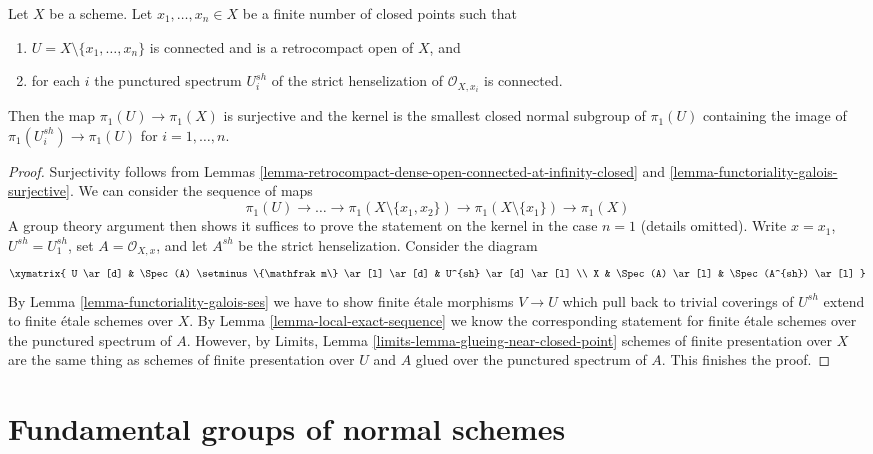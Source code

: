\begin{lemma}
\label{lemma-exact-sequence-finite-nr-closed-pts}
Let $X$ be a scheme. Let $x_1, \ldots, x_n \in X$ be a finite
number of closed points such that
\begin{enumerate}
\item $U = X \setminus \{x_1, \ldots, x_n\}$ is connected and is
a retrocompact open of $X$, and
\item for each $i$ the punctured spectrum $U_i^{sh}$ of the
strict henselization of $\mathcal{O}_{X, x_i}$ is connected.
\end{enumerate}
Then the map $\pi_1(U) \to \pi_1(X)$ is surjective and the kernel
is the smallest closed normal subgroup of $\pi_1(U)$ containing
the image of $\pi_1(U_i^{sh}) \to \pi_1(U)$ for $i = 1, \ldots, n$.
\end{lemma}

\begin{proof}
Surjectivity follows from
Lemmas \ref{lemma-retrocompact-dense-open-connected-at-infinity-closed} and
\ref{lemma-functoriality-galois-surjective}.
We can consider the sequence of maps
$$
\pi_1(U)  \to \ldots \to
\pi_1(X \setminus \{x_1, x_2\}) \to \pi_1(X \setminus \{x_1\}) \to \pi_1(X)
$$
A group theory argument then shows it suffices to prove the statement on the
kernel in the case $n = 1$ (details omitted). Write
$x = x_1$, $U^{sh} = U_1^{sh}$,
set $A = \mathcal{O}_{X, x}$, and let $A^{sh}$ be the strict henselization.
Consider the diagram
$$
\xymatrix{
U \ar[d] &
\Spec(A) \setminus \{\mathfrak m\} \ar[l] \ar[d] &
U^{sh} \ar[d] \ar[l] \\
X & \Spec(A) \ar[l] & \Spec(A^{sh}) \ar[l]
}
$$
By Lemma \ref{lemma-functoriality-galois-ses}
we have to show finite \'etale morphisms
$V \to U$ which pull back to trivial coverings of $U^{sh}$
extend to finite \'etale schemes over $X$.
By Lemma \ref{lemma-local-exact-sequence}
we know the corresponding statement
for finite \'etale schemes over the punctured spectrum of $A$.
However, by Limits, Lemma \ref{limits-lemma-glueing-near-closed-point}
schemes of finite presentation over $X$ are the same thing as
schemes of finite presentation over $U$ and $A$ glued over
the punctured spectrum of $A$. This finishes the proof.
\end{proof}









\section{Fundamental groups of normal schemes}
\label{section-normal}

